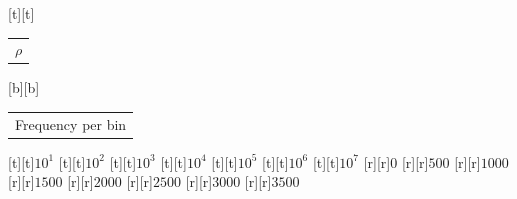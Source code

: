 %    
%
%
\begin{psfrags}%
\psfragscanon%
%
[t][t]{\color[rgb]{0,0,0}\setlength{\tabcolsep}{0pt}\begin{tabular}{c}{\Large$\rho$}\end{tabular}}%
[b][b]{\color[rgb]{0,0,0}\setlength{\tabcolsep}{0pt}\begin{tabular}{c}{\Large Frequency per bin}\end{tabular}}%
%
[t][t]{$10^1$}%
[t][t]{$10^2$}%
[t][t]{$10^3$}%
[t][t]{$10^4$}%
[t][t]{$10^5$}%
[t][t]{$10^6$}%
[t][t]{$10^7$}%
%
[r][r]{$0$}%
[r][r]{$500$}%
[r][r]{$1000$}%
[r][r]{$1500$}%
[r][r]{$2000$}%
[r][r]{$2500$}%
[r][r]{$3000$}%
[r][r]{$3500$}%
%
%
\end{psfrags}%
%
